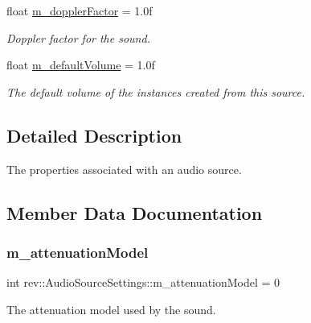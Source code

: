 \begin{Indent}
\begin{DoxyCompactItemize}
\mbox{\label{structrev_1_1_audio_source_settings_a7324f9abd18468709c256db8935a1f91}} 
float \mbox{\hyperlink{structrev_1_1_audio_source_settings_a7324f9abd18468709c256db8935a1f91}{m\+\_\+doppler\+Factor}} = 1.\+0f
\begin{DoxyCompactList}\small\item\em Doppler factor for the sound. \end{DoxyCompactList}\item 
\mbox{\label{structrev_1_1_audio_source_settings_a89a0fc4826a2147ef752a14a0603dbfc}} 
float \mbox{\hyperlink{structrev_1_1_audio_source_settings_a89a0fc4826a2147ef752a14a0603dbfc}{m\+\_\+default\+Volume}} = 1.\+0f
\begin{DoxyCompactList}\small\item\em The default volume of the instances created from this source. \end{DoxyCompactList}\end{DoxyCompactItemize}
\end{Indent}


\subsection{Detailed Description}
The properties associated with an audio source. 

\subsection{Member Data Documentation}
\mbox{\label{structrev_1_1_audio_source_settings_a3a69739a104b204a4836b60f5c71b9ea}} 
\subsubsection{\texorpdfstring{m\_attenuationModel}{m\_attenuationModel}}
{\footnotesize\ttfamily int rev\+::\+Audio\+Source\+Settings\+::m\+\_\+attenuation\+Model = 0}



The attenuation model used by the sound. 


